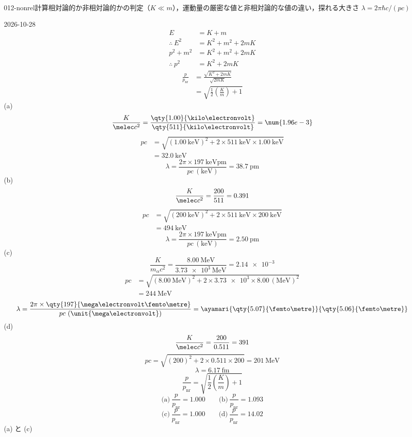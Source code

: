 \documentclass[uplatex,dvipdfmx,a4paper,11pt]{jsarticle}
\begin{document}
\begin{mondai}{012-nonrel}{計算}{相対論的か非相対論的かの判定（$K\ll m$），運動量の厳密な値と非相対論的な値の違い，探れる大きさ $\lambda=2\pi\hbar c/(pc)$}
\begin{shoumon}
  \end{shoumon}
\begin{kotaeutsushi}{2026-10-28}
\begin{align*}
  E&=K+m\\
  \therefore\ E^{2}&=K^{2}+m^{2}+2mK\\
  p^{2}+m^{2}&=K^{2}+m^{2}+2mK\\
  \therefore\ p^{2}&=K^{2}+2mK
\end{align*}
\begin{align*}
  \frac{p}{p_{\mathrm{nr}}}&=\frac{\sqrt{K^{2}+2mK}}{\sqrt{2mK}}\\
  &=\sqrt{\frac{1}{2}\left(\frac{K}{m}\right)+1}
\end{align*}
(a)
\[ \frac{K}{\melec c^{2}}=\frac{\qty{1.00}{\kilo\electronvolt}}{\qty{511}{\kilo\electronvolt}}=\num{1.96e-3} \]
\begin{align*}
  pc&=\sqrt{(\qty{1.00}{\kilo\electronvolt})^{2}+2\times\qty{511}{\kilo\electronvolt}\times\qty{1.00}{\kilo\electronvolt}}\\
  &=\qty{32.0}{\kilo\electronvolt}
\end{align*}
\[ \lambda=\frac{2\pi\times\qty{197}{\kilo\electronvolt\pico\metre}}{pc\ (\unit{\kilo\electronvolt})}=\qty{38.7}{\pico\metre} \]
(b)
\[ \frac{K}{\melec c^{2}}=\frac{200}{511}=0.391 \]
\begin{align*}
  pc&=\sqrt{(\qty{200}{\kilo\electronvolt})^{2}+2\times\qty{511}{\kilo\electronvolt}\times\qty{200}{\kilo\electronvolt}}\\
  &=\qty{494}{\kilo\electronvolt}
\end{align*}
\[ \lambda=\frac{2\pi\times\qty{197}{\kilo\electronvolt\pico\metre}}{pc\ (\unit{\kilo\electronvolt})}=\qty{2.50}{\pico\metre} \]
(c)
\[ \frac{K}{m_{\alpha}c^{2}}=\frac{\qty{8.00}{\mega\electronvolt}}{\qty{3.73e3}{\mega\electronvolt}}=\num{2.14e-3} \]
\begin{align*}
  pc&=\sqrt{(\qty{8.00}{\mega\electronvolt})^{2}+2\times\num{3.73e3}\times8.00\,(\unit{\mega\electronvolt})^{2}}\\
  &=\qty{244}{\mega\electronvolt}
\end{align*}
\[ \lambda=\frac{2\pi\times\qty{197}{\mega\electronvolt\femto\metre}}{pc\ (\unit{\mega\electronvolt})}=\ayamari{\qty{5.07}{\femto\metre}}{\qty{5.06}{\femto\metre}} \]
(d)
\[ \frac{K}{\melec c^{2}}=\frac{200}{0.511}=391 \]
\[ pc=\sqrt{(200)^{2}+2\times0.511\times200}=\qty{201}{\mega\electronvolt} \]
\[ \lambda=\qty{6.17}{\femto\metre} \]
\[ \frac{p}{p_{\mathrm{nr}}}=\sqrt{\frac{1}{2}\left(\frac{K}{m}\right)+1} \]
\[ \text{(a)}\ \frac{p}{p_{\mathrm{nr}}}=1.000\qquad\text{(b)}\ \frac{p}{p_{\mathrm{nr}}}=1.093 \]
\[ \text{(c)}\ \frac{p}{p_{\mathrm{nr}}}=1.000\qquad\text{(d)}\ \frac{p}{p_{\mathrm{nr}}}=14.02 \]
(a) と (c)


\end{kotaeutsushi}
\end{mondai}
\end{document}
